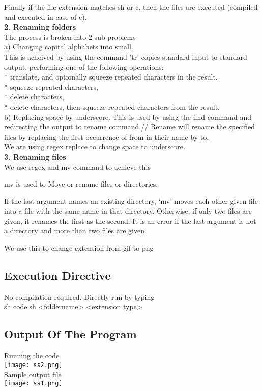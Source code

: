 \documentclass[paper=a4, fontsize=11pt]{scrartcl} %
\numberwithin{equation}{section} %
\numberwithin{figure}{section} %
\numberwithin{table}{section} %
\begin{document}
Finally if the file extension matches sh or c, then the files are executed (compiled and executed in case of c).\\


\textbf{2. Renaming folders}\\
The process is broken into 2 sub problems\\

a) Changing capital alphabets into small.\\
This is acheived by using the command  'tr' copies standard input to standard output, performing one of the following operations:\\
* translate, and optionally squeeze repeated characters in the result,\\
* squeeze repeated characters,\\
* delete characters,\\
* delete characters, then squeeze repeated characters from the result.\\


b) Replacing space by underscore.
This is used by using the find command and redirecting the output to rename command.//
Rename will rename the specified files by replacing the first occurrence of from in their name by to.\\ We are using regex replace to change space  to underscore.\\

\textbf{3. Renaming files}\\
We use regex and mv command to achieve this

mv is used to Move or rename files or directories.

If the last argument names an existing directory, `mv' moves each other given file into a file with the same name in that directory. Otherwise, if only two files are given, it renames the first as the second. It is an error if the last argument is not a directory and more than two files are given.

We use this to change extension from gif to png

\newpage
\subsection{Execution Directive}
No compilation required. Directly run by typing\\

sh code.sh <foldername> <extension type>\\

\subsection{Output Of The Program}
Running the code\\
 {\center\texttt{[image: ss2.png]}}\\
Sample output file\\
 {\center\texttt{[image: ss1.png]}}\\
\end{document}
